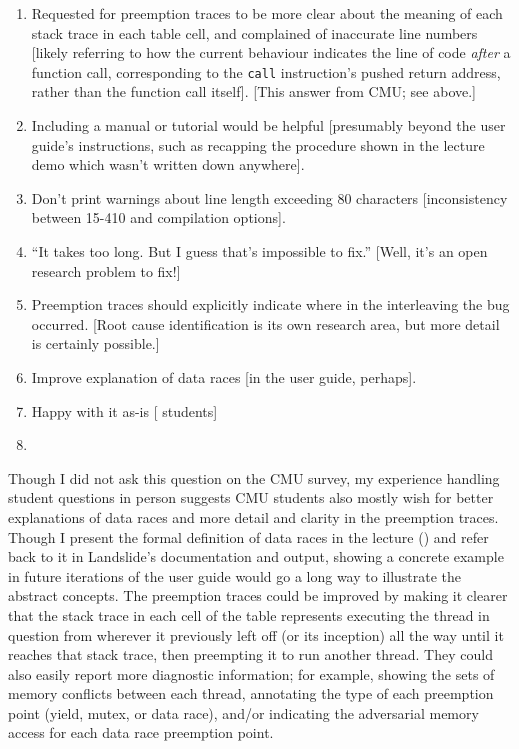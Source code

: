 \begin{enumerate}
	\item Requested for preemption traces to be more clear about the meaning of each stack trace in each table cell,
		and complained of inaccurate line numbers
		[likely referring to how the current behaviour indicates the line of code {\em after} a function call,
		corresponding to the {\tt call} instruction's pushed return address,
		rather than the function call itself]. [This answer from CMU; see above.]
	\item Including a manual or tutorial would be helpful [presumably beyond the user guide's instructions, such as recapping the procedure shown in the lecture demo which wasn't written down anywhere].
	\item Don't print warnings about line length exceeding 80 characters [inconsistency between 15-410 and \psuos compilation options].
	\item ``It takes too long. But I guess that's impossible to fix.'' [Well, it's an open research problem to fix!]
	\item Preemption traces should explicitly indicate where in the interleaving the bug occurred.
		[Root cause identification is its own research area, but more detail is certainly possible.]
	\item Improve explanation of data races [in the user guide, perhaps].
	\item Happy with it as-is [ students]
	\item {}
\end{enumerate}

Though I did not ask this question on the CMU survey,
my experience handling student questions in person
suggests CMU students
also mostly wish for
better explanations of data races and
more detail and clarity in the preemption traces.
Though I present the formal definition of data races in the lecture
(\sect{\ref{sec:education-pebbles-recruiting}})
and refer back to it in Landslide's documentation and output,
showing a concrete example
in future iterations of the user guide
would go a long way to illustrate the abstract concepts.
The preemption traces could be improved by making it clearer that the stack trace in each cell of the table
represents executing the thread in question from wherever it previously left off (or its inception)
all the way until it reaches that stack trace, then preempting it to run another thread.
They could also easily report more diagnostic information;
for example, showing the sets of memory conflicts between each thread,
annotating the type of each preemption point (yield, mutex, or data race),
and/or indicating the adversarial memory access for each data race preemption point.

